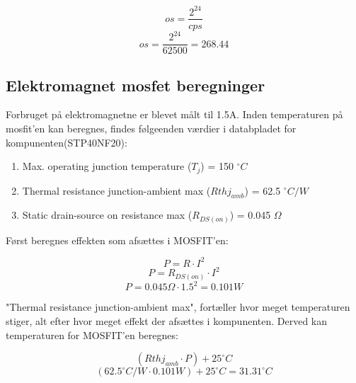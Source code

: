 $$os = \frac{2^{24}}{cps}$$
$$os = \frac{2^{24}}{62500} = 268.44$$



\newpage
\subsection{Elektromagnet mosfet beregninger}
\label{subsec:mosfet}
Forbruget på elektromagnetne er blevet målt til 1.5A. Inden temperaturen på mosfit'en kan beregnes, findes følgeenden værdier i databpladet for kompunenten(STP40NF20):
\begin{enumerate}
\item Max. operating junction temperature ($T_j$) = 150 $^\circ C$
\item Thermal resistance junction-ambient max ($Rthj_{amb}$) = 62.5 $^\circ C/W$
\item Static drain-source on resistance max ($R_{DS(on)}$) = 0.045 $\Omega$
\end{enumerate}
Først beregnes effekten som afsættes i MOSFIT'en:

$$P = R \cdot I^2$$
$$P = R_{DS(on)} \cdot I^2$$
$$P = 0.045 \Omega \cdot 1.5^2 = 0.101 W$$

"Thermal resistance junction-ambient max", fortæller hvor meget temperaturen stiger, alt efter hvor meget effekt der afsættes i kompunenten. Derved kan temperaturen for MOSFIT'en beregnes:

$$(Rthj_{amb} \cdot P) + 25^\circ C$$
$$(62.5^\circ C/W  \cdot 0.101 W) + 25^\circ C = 31.31 ^\circ C$$
